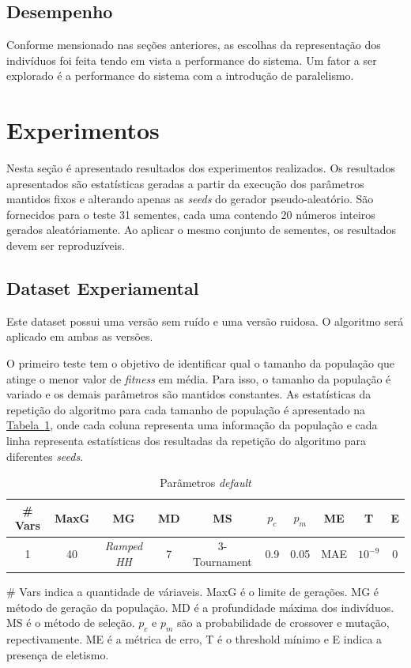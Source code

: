 \documentclass[a4paper]{paper}
\begin{document}
\subsection{Desempenho}

Conforme mensionado nas seções anteriores, as escolhas da representação dos
indivíduos foi feita tendo em vista a performance do sistema. Um fator a ser
explorado é a performance do sistema com a introdução de paralelismo.

\section{Experimentos}
Nesta seção é apresentado resultados dos experimentos realizados. Os resultados
apresentados são estatísticas geradas a partir da execução dos parâmetros
mantidos fixos e alterando apenas as \textit{seeds} do gerador
pseudo-aleatório. São fornecidos para o teste 31 sementes, cada uma contendo 20
números inteiros gerados aleatóriamente.  Ao aplicar o mesmo conjunto de
sementes, os resultados devem ser reproduzíveis.

\subsection{Dataset Experiamental}
Este dataset possui uma versão sem ruído e uma versão ruidosa. O algoritmo será
aplicado em ambas as versões.

O primeiro teste tem o objetivo de identificar qual o tamanho da população que
atinge o menor valor de \textit{fitness} em média. Para isso, o tamanho da
população é variado e os demais parâmetros são mantidos constantes. As
estatísticas da repetição do algoritmo para cada tamanho de população é
apresentado na \hyperref[tbl:default_param]{Tabela~\ref*{tbl:default_param}},
onde cada coluna representa uma informação da população e cada linha representa
estatísticas dos resultadas da repetição do algoritmo para diferentes
\textit{seeds}.

\noindent
\begin{table}
  \center
  \caption{Parâmetros \textit{default}}
  \label{tbl:default_param}
  \begin{tabular}{| c | c | c | c | c | c | c | c | c | c |}
    \hline
    \# Vars & MaxG & MG & MD & MS & $p_c$ & $p_m$ & ME & T & E \\
    \hline
    1 & 40 & \textit{Ramped HH} & 7 & 3-Tournament & 0.9 & 0.05 & MAE & $10^{-9}$ & 0 \\
    \hline
  \end{tabular}
  \begin{minipage}{.9\textwidth}{\footnotesize \# Vars indica a quantidade de
      váriaveis. MaxG é o limite de gerações. MG é método de geração da
      população. MD é a profundidade máxima dos indivíduos. MS é o método de
      seleção.  $p_c$ e $p_m$ são a probabilidade de crossover e mutação,
      repectivamente. ME é a métrica de erro, T é o threshold mínimo e E indica
      a presença de eletismo.}\end{minipage}
\end{table}
\end{document}
